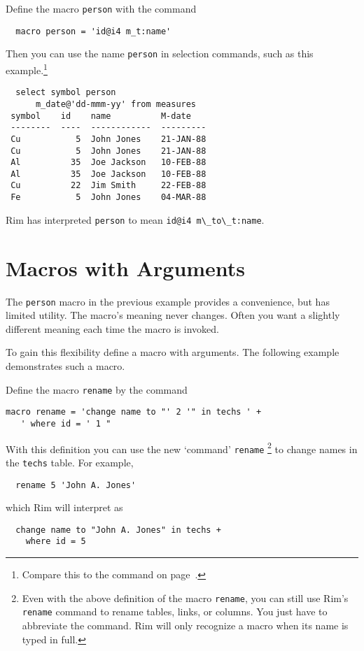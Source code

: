 \documentclass[11pt,a4paper]{report}
\begin{document}
Define the macro \verb!person! with the command
\begin{verbatim}
  macro person = 'id@i4 m_t:name'
\end{verbatim}

Then you can use the name \verb!person! in selection commands, such as
this example.\footnote{Compare this to the command on
page~\pageref{sel-dem1}.}
 
\begin{verbatim}
  select symbol person 
      m_date@'dd-mmm-yy' from measures
 symbol    id    name          M-date
 --------  ----  ------------  ---------
 Cu           5  John Jones    21-JAN-88
 Cu           5  John Jones    21-JAN-88
 Al          35  Joe Jackson   10-FEB-88
 Al          35  Joe Jackson   10-FEB-88
 Cu          22  Jim Smith     22-FEB-88
 Fe           5  John Jones    04-MAR-88
\end{verbatim}
 
Rim has interpreted \verb!person! to mean
\verb!id@i4 m\_to\_t:name!.
 
\section{Macros with Arguments}
The \verb!person! macro in the previous example provides a convenience,
but has limited utility.  The macro's meaning never changes.
Often you want a slightly different meaning
each time the macro is invoked.
 
To gain this flexibility define a macro
with arguments.
The following example demonstrates such a macro.
 
Define the macro \verb!rename! by the command
\begin{verbatim}
macro rename = 'change name to "' 2 '" in techs ' +
   ' where id = ' 1 "
\end{verbatim}
\label{rename-def}
 
With this definition
you can use the new `command' \verb!rename!
   \footnote{ Even with the above definition of the macro
   {\tt rename}, you can
    still use Rim's {\tt rename} command to rename tables, links, or
   columns.  You just have to abbreviate the command.
   Rim will only recognize a macro when its name
   is typed in full.}
to change names in
the \verb!techs! table. For example,
\begin{verbatim}
  rename 5 'John A. Jones' 
\end{verbatim}
which Rim will interpret as
\begin{verbatim}
  change name to "John A. Jones" in techs +
    where id = 5 
\end{verbatim}
 
\end{document}
